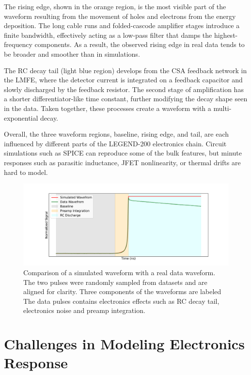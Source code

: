 The rising edge, shown in the orange region, is the most visible part of the waveform resulting from the movement of holes and electrons from the energy deposition. The long cable runs and folded-cascode amplifier stages introduce a finite bandwidth, effectively acting as a low-pass filter that damps the highest-frequency components. As a result, the observed rising edge in real data tends to be broader and smoother than in simulations. 

The RC decay tail (light blue region) develops from the CSA feedback network in the LMFE, where the detector current is integrated on a feedback capacitor and slowly discharged by the feedback resistor. The second stage of amplification has a shorter differentiator-like time constant, further modifying the decay shape seen in the data. Taken together, these processes create a waveform with a multi-exponential decay. 


Overall, the three waveform regions, baseline, rising edge, and tail, are each influenced by different parts of the LEGEND-200 electronics chain. Circuit simulations such as SPICE can reproduce some of the bulk features, but minute responses such as parasitic inductance, JFET nonlinearity, or thermal drifts are hard to model.

\begin{figure}[!htb]%
    \includegraphics[width=\linewidth,trim={4cm 0pc 3.5cm 0pc},clip]{ch6/figs/wf_comp_sim_data.pdf}
    \caption{Comparison of a simulated waveform with a real data waveform. The two pulses were randomly sampled from datasets and are aligned for clarity. Three components of the waveforms are labeled The data pulses contains electronics effects such as RC decay tail, electronics noise and preamp integration.}
    \label{fig:sim_data_comp}
\end{figure}

\section{Challenges in Modeling Electronics Response}


